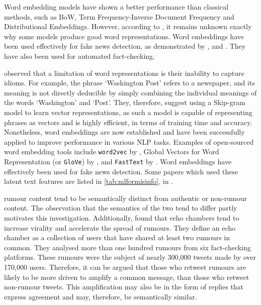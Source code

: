 Word embedding models have shown a better performance than classical methods, such as \ac{BoW}, Term Frequency-Inverse Document Frequency and Distributional Embeddings. However, according to , it remains unknown exactly why some models produce good word representations. Word embeddings have been used effectively for fake news detection, as demonstrated by ,  and . They have also been used for automated fact-checking.

 observed that a limitation of word representations is their inability to capture idioms. For example, the phrase `Washington Post' refers to a newspaper, and its meaning is not directly deducible by simply combining the individual meanings of the words `Washington' and `Post'. They, therefore, suggest using a Skip-gram model to learn vector representations, as such a model is capable of representing phrases as vectors and is highly efficient, in terms of training time and accuracy. Nonetheless, word embeddings are now established and have been successfully applied to improve performance in various \ac{NLP} tasks. Examples of open-sourced word embedding tools include \texttt{word2vec} by , Global Vectors for Word Representation (or \texttt{GloVe}) by , and \texttt{FastText} by . Word embeddings have effectively been used for fake news detection. Some papers which used these latent text features are listed in \autoref{tab:mlformisinfo}, in .

 rumour content tend to be semantically distinct from authentic or non-rumour content. The observation that the semantics of the two tend to differ partly motivates this investigation. Additionally,  found that echo chambers tend to increase virality and accelerate the spread of rumours. They define an echo chamber as a collection of users that have shared at least two rumours in common. They analysed more than one hundred rumours from six fact-checking platforms. These rumours were the subject of nearly 300,000 tweets made by over 170,000 users. Therefore, it can be argued that those who retweet rumours are likely to be more driven to amplify a common message, than those who retweet non-rumour tweets. This amplification may also be in the form of replies that express agreement and may, therefore, be semantically similar.

